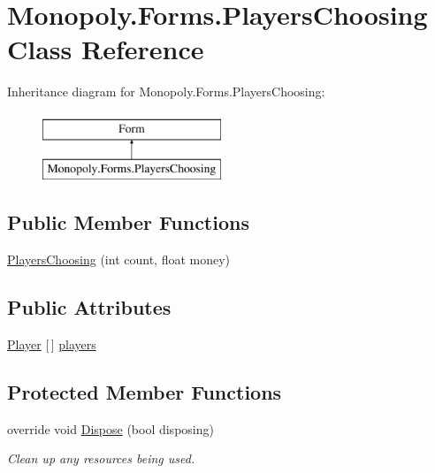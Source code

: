 \hypertarget{class_monopoly_1_1_forms_1_1_players_choosing}{}\section{Monopoly.\+Forms.\+Players\+Choosing Class Reference}
\label{class_monopoly_1_1_forms_1_1_players_choosing}
Inheritance diagram for Monopoly.\+Forms.\+Players\+Choosing\+:\begin{figure}[H]
\begin{center}
\leavevmode
\includegraphics[height=2.000000cm]{class_monopoly_1_1_forms_1_1_players_choosing}
\end{center}
\end{figure}
\subsection*{Public Member Functions}
\begin{DoxyCompactItemize}
\item 
\mbox{\hyperlink{class_monopoly_1_1_forms_1_1_players_choosing_a3c0f320fbc40f7b080e67359e866b158}{Players\+Choosing}} (int count, float money)
\end{DoxyCompactItemize}
\subsection*{Public Attributes}
\begin{DoxyCompactItemize}
\item 
\mbox{\hyperlink{class_monopoly_1_1_players_1_1_player}{Player}} \mbox{[}$\,$\mbox{]} \mbox{\hyperlink{class_monopoly_1_1_forms_1_1_players_choosing_a5f63db54ee80fbdf21885eff762dbb6e}{players}}
\end{DoxyCompactItemize}
\subsection*{Protected Member Functions}
\begin{DoxyCompactItemize}
\item 
override void \mbox{\hyperlink{class_monopoly_1_1_forms_1_1_players_choosing_a3b3a3a60517c2bc350d176ea07976f8e}{Dispose}} (bool disposing)
\begin{DoxyCompactList}\small\item\em Clean up any resources being used. \end{DoxyCompactList}\end{DoxyCompactItemize}


